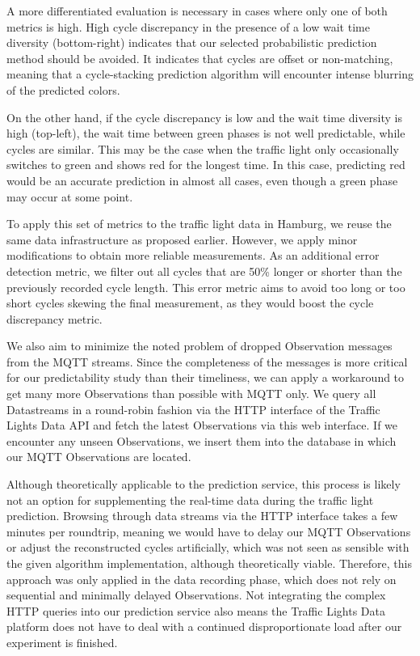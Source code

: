 A more differentiated evaluation is necessary in cases where only one of both metrics is high. High cycle discrepancy in the presence of a low wait time diversity (bottom-right) indicates that our selected probabilistic prediction method should be avoided. It indicates that cycles are offset or non-matching, meaning that a cycle-stacking prediction algorithm will encounter intense blurring of the predicted colors. 

On the other hand, if the cycle discrepancy is low and the wait time diversity is high (top-left), the wait time between green phases is not well predictable, while cycles are similar. This may be the case when the traffic light only occasionally switches to green and shows red for the longest time. In this case, predicting red would be an accurate prediction in almost all cases, even though a green phase may occur at some point.

To apply this set of metrics to the traffic light data in Hamburg, we reuse the same data infrastructure as proposed earlier. However, we apply minor modifications to obtain more reliable measurements. As an additional error detection metric, we filter out all cycles that are 50\% longer or shorter than the previously recorded cycle length. This error metric aims to avoid too long or too short cycles skewing the final measurement, as they would boost the cycle discrepancy metric.

We also aim to minimize the noted problem of dropped Observation messages from the MQTT streams. Since the completeness of the messages is more critical for our predictability study than their timeliness, we can apply a workaround to get many more Observations than possible with MQTT only. We query all Datastreams in a round-robin fashion via the HTTP interface of the Traffic Lights Data API and fetch the latest Observations via this web interface. If we encounter any unseen Observations, we insert them into the database in which our MQTT Observations are located. 

Although theoretically applicable to the prediction service, this process is likely not an option for supplementing the real-time data during the traffic light prediction. Browsing through data streams via the HTTP interface takes a few minutes per roundtrip, meaning we would have to delay our MQTT Observations or adjust the reconstructed cycles artificially, which was not seen as sensible with the given algorithm implementation, although theoretically viable. Therefore, this approach was only applied in the data recording phase, which does not rely on sequential and minimally delayed Observations. Not integrating the complex HTTP queries into our prediction service also means the Traffic Lights Data platform does not have to deal with a continued disproportionate load after our experiment is finished.

